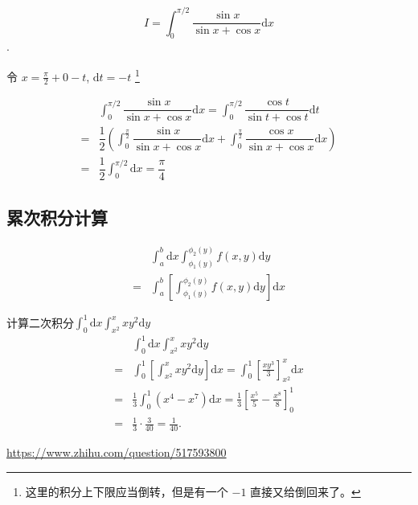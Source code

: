 \begin{example}
    \[
        I = \int _0^{\pi/2} \dfrac{\sin x}{\sin x + \cos x} \mathrm{d}x 
    \]
    \cite[page 111, pdf 122, example 10]{we}.

    令 $x = \frac{\pi}{2} + 0 - t$, $\mathrm{d}t = -t$
    \footnote{这里的积分上下限应当倒转，但是有一个 $-1$ 直接又给倒回来了。}

    \begin{align*}
        &\int_0^{\pi/2} \dfrac{\sin x}{\sin x + \cos x} \mathrm{d}x 
        = \int_0^{\pi/2} \dfrac{\cos t}{\sin t + \cos t} \mathrm{d}t \\ 
        = &\dfrac{1}{2} 
        \left(
            \int_0^{\frac{\pi}{2}} 
            \dfrac{\sin x}{\sin x + \cos x} \mathrm{d}x 
            + \int_0^{\frac{\pi}{2}} 
            \dfrac{\cos x}{\sin x + \cos x} \mathrm{d}x
        \right) \\
        = &\dfrac{1}{2} \int_0^{\pi/2} \mathrm{d}x = \dfrac{\pi}{4}
    \end{align*}
\end{example}

\subsection{累次积分计算}

\begin{definition}[累次积分交换次序]
    \begin{align*}
         &\int_a^b \mathrm{d}x \int_{\phi_1(y)}^{\phi_2(y)} 
         f(x, y) \mathrm{d}y \\[1em]
        =&\int_a^b
        \left[
            \int_{\phi_1(y)}^{\phi_2(y)} f(x, y) \mathrm{d}y
        \right] \mathrm{d}x
    \end{align*}
\end{definition}

\begin{example}
    计算二次积分$\int_0^1 \mathrm{d}x \int_{x^2}^{x} xy^2 \mathrm{d}y$
    \begin{align*} 
        &\int_{0}^{1} \text{d}x \int_{x^2}^{x} xy^2 \text{d}y  \\
        = &\int_{0}^{1} 
        \left[ 
            \int_{x^2}^{x} xy^2 \text{d}y 
        \right] 
        \text{d}x 
        = \int_{0}^{1} 
        \left[ 
            \frac{xy^3}{3} 
        \right]_{x^2}^{x} \text{d}x \\ 
        =& \frac{1}{3} \int_{0}^{1} (x^4 - x^7) \text{d}x 
        = \frac{1}{3} 
        \left[ 
            \frac{x^5}{5} - \frac{x^8}{8} 
        \right]_{0}^{1} \\ 
        =& \frac{1}{3} \cdot \frac{3}{40} = \frac{1}{40}.
    \end{align*}

    \url{https://www.zhihu.com/question/517593800}
\end{example}


